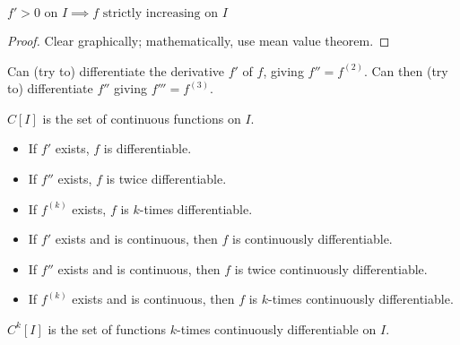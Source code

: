 \begin{property}
	$f' > 0 \text{ on } I \implies f \text{ strictly increasing on } I$
\end{property}
\begin{proof}
	Clear graphically; mathematically, use mean value theorem.
\end{proof}

Can (try to) differentiate the derivative $f'$ of $f$, giving $f'' = f^{(2)}$.
Can then (try to) differentiate $f''$ giving $f''' = f^{(3)}$.
\begin{definition}
	$C \left[ I \right]$ is the set of continuous functions on $I$.
	\begin{itemize}
		\item If $f'$ exists, $f$ is differentiable.
		\item If $f''$ exists, $f$ is twice differentiable.	
		\item If $f^{(k)}$ exists, $f$ is $k$-times differentiable.
	\end{itemize}
	\begin{itemize}
		\item If $f'$ exists and is continuous, then $f$ is continuously differentiable.
		\item If $f''$ exists and is continuous, then $f$ is twice continuously differentiable.
		\item If $f^{(k)}$ exists and is continuous, then $f$ is $k$-times continuously differentiable.
	\end{itemize}
	$C^k \left[ I \right]$ is the set of functions $k$-times continuously differentiable on $I$.
\end{definition}
